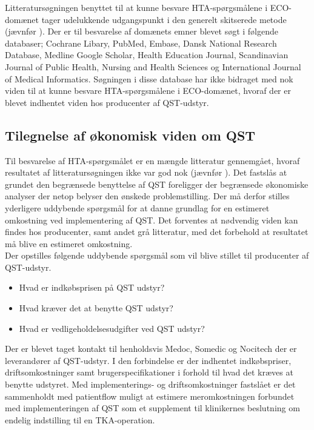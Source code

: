 Litteratursøgningen benyttet til at kunne besvare HTA-spørgsmålene i ECO-domænet tager udelukkende udgangspunkt i den generelt skitserede metode (jævnfør ). Der er til besvarelse af domænets emner blevet søgt i følgende databaser; Cochrane Libary, PubMed, Embase, Dansk National Research Database, Medline Google Scholar, Health Education Journal, Scandinavian Journal of Public Health, Nursing and Health Sciences og International Journal of Medical Informatics. Søgningen i disse database har ikke bidraget med nok viden til at kunne besvare HTA-spørgsmålene i ECO-domænet, hvoraf der er blevet indhentet viden hos producenter af QST-udstyr.


\subsection{Tilegnelse af økonomisk viden om QST}
Til besvarelse af HTA-spørgsmålet er en mængde litteratur gennemgået, hvoraf resultatet af litteratursøgningen ikke var god nok (jævnfør ). Det fastslås at grundet den begrænsede benyttelse af QST foreligger der begrænsede økonomiske analyser der netop belyser den ønskede problemstilling. Der må derfor stilles yderligere uddybende spørgsmål for at danne grundlag for en estimeret omkostning ved implementering af QST. Det forventes at nødvendig viden kan findes hos producenter, samt andet grå litteratur, med det forbehold at resultatet må blive en estimeret omkostning.\\ 
Der opstilles følgende uddybende spørgsmål som vil blive stillet til producenter af QST-udstyr.

\begin{itemize}  
\item Hvad er indkøbsprisen på QST udstyr? 
\item Hvad kræver det at benytte QST udstyr? 
\item Hvad er vedligeholdelsesudgifter ved QST udstyr?
\end{itemize}

Der er blevet taget kontakt til henholdsvis Medoc, Somedic og Nocitech der er leverandører af QST-udstyr. I den forbindelse er der indhentet indkøbspriser, driftsomkostninger samt brugerspecifikationer i forhold til hvad det kræves at benytte udstyret. Med implementerings- og driftsomkostninger fastslået er det sammenholdt med patientflow muligt at estimere meromkostningen forbundet med implementeringen af QST som et supplement til klinikernes beslutning om endelig indstilling til en TKA-operation. 

